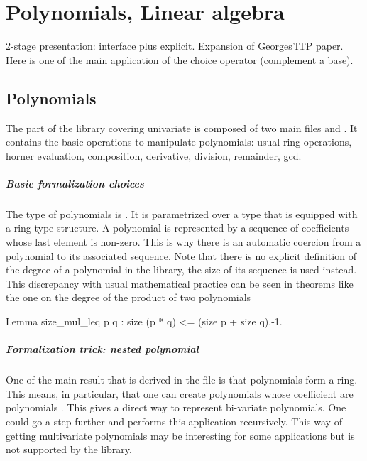\chapter{Polynomials, Linear algebra}

2-stage presentation: interface plus explicit. Expansion of
Georges'ITP paper. Here is one of the main application of the choice
operator (complement a base).


\section{Polynomials}
\label{sec:poly}

The part of the library covering univariate is composed of two main files
 and . It contains the basic operations to manipulate
polynomials: usual ring operations, horner evaluation, composition, derivative, division, remainder, gcd.

\paragraph{Basic formalization choices} 
The type of polynomials is . It is parametrized over a type 
that is equipped with a ring type structure.
A polynomial is represented by a sequence of coefficients whose last element is non-zero.
This is why there is an automatic coercion from a polynomial to its associated sequence.
Note that there is no explicit definition of the degree of a polynomial in the library, 
the size of  its sequence is used instead. This discrepancy with usual mathematical practice can
be seen in theorems like the one on the degree of the product of two 
polynomials 

\begin{coq}{}{}
Lemma size_mul_leq p q : size (p * q) <= (size p + size q).-1.
\end{coq}
\paragraph{Formalization trick: nested polynomial}
One of the  main result that is derived in the file  is that polynomials
form a ring. This means, in particular, that one can create polynomials 
whose coefficient are polynomials . This gives a direct way to 
represent bi-variate polynomials. One could go a step further and performs this application
recursively.
This way of getting multivariate polynomials may be interesting for some applications
but is not supported by the library.

